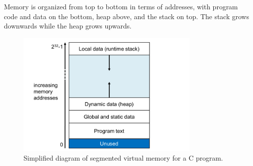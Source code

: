 \documentclass[11pt]{article}
\begin{document}
		Memory is organized from top to bottom in terms of addresses, with program code and data on the bottom, heap above, and the stack on top. The stack grows downwards while the heap grows upwards.
		
	\begin{figure}[htb]
		\centering
		\includegraphics[width=0.8\textwidth]{vmem.png}
		\caption{Simplified diagram of segmented virtual memory for a C program.}
		\label{fig:virtual memory}
	\end{figure}

%		
%		


\end{document}
